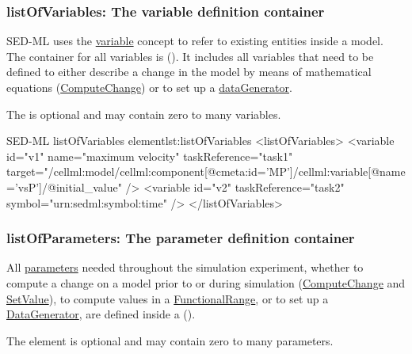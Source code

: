 \subsubsection{listOfVariables: The variable definition container}
\label{sec:listOfVariables}

SED-ML uses the \hyperref[class:variable]{variable} concept to refer to existing entities inside a model. The container for all variables is   (). It includes all variables that need to be defined to either describe a change in the model by means of mathematical equations (\hyperref[class:computeChange]{ComputeChange}) or to set up a \hyperref[class:dataGenerator]{dataGenerator}.

%

 The  is optional and may contain zero to many variables. 
%
\begin{myXmlLst}{SED-ML listOfVariables element}{lst:listOfVariables}
<listOfVariables>
 <variable id="v1" name="maximum velocity" taskReference="task1" 
     target="/cellml:model/cellml:component[@cmeta:id='MP']/cellml:variable[@name='vsP']/@initial_value" />
 <variable id="v2" taskReference="task2" symbol="urn:sedml:symbol:time" />
</listOfVariables>
\end{myXmlLst}


\subsubsection{listOfParameters: The parameter definition container}
\label{sec:listOfParameters}
All \hyperref[class:parameter]{parameters} needed throughout the simulation experiment, whether to compute a change on a model prior to or during simulation (\hyperref[class:computeChange]{ComputeChange} and \hyperref[class:setValue]{SetValue}), to compute values in a \hyperref[class:functionalRange]{FunctionalRange}, or to set up a \hyperref[class:dataGenerator]{DataGenerator}, are defined inside a  ().


The element is optional and may contain zero to many parameters.

